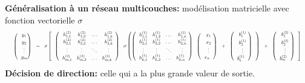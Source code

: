 \documentclass[10pt]{beamer}
\begin{document}
\begin{frame}
\begin{columns}[T]
\begin{column}{0.60\textwidth}
  \vspace{-0.4cm}
  \textbf{Généralisation à un réseau multicouches:} modélisation matricielle avec fonction vectorielle $\sigma$
  \begin{equation*}
  \resizebox{\textwidth}{!}{
  $\begin{pmatrix}
    y_{1} \\[0.3em]
    y_{2} \\
    \vdots \\
    y_{m}
  \end{pmatrix}
    =
    \sigma\left[
    \begin{pmatrix}
    h^{(2)}_{1,1} & h^{(2)}_{1,2} & \ldots & h^{(2)}_{1,k} \\
    h^{(2)}_{2,1} & h^{(2)}_{2,2} & \ldots & h^{(2)}_{2,k} \\
    \vdots & \vdots & \ddots & \vdots \\
    h^{(2)}_{m,1} & h^{(2)}_{m,2} & \ldots & h^{(2)}_{m,k}
    \end{pmatrix}
    \sigma\left(
  \begin{pmatrix}
    h^{(1)}_{1,1} & h^{(1)}_{1,2} & \ldots & h^{(1)}_{1,n} \\
    h^{(1)}_{2,1} & h^{(1)}_{2,2} & \ldots & h^{(1)}_{2,n} \\
    \vdots & \vdots & \ddots & \vdots \\
    h^{(1)}_{k,1} & h^{(1)}_{k,2} & \ldots & h^{(1)}_{k,n}
    \end{pmatrix}
    \begin{pmatrix}
    x_{1} \\[0.3em]
    x_{2} \\
    \vdots \\
    x_{n}
    \end{pmatrix}
    +
    \begin{pmatrix}
    b_{1}^{(1)} \\[0.3em]
    b_{2}^{(1)} \\
    \vdots \\
    b_{k}^{(1)}
    \end{pmatrix}
    \right)
    +
    \begin{pmatrix}
    b_{1}^{(2)} \\[0.3em]
    b_{2}^{(2)} \\
    \vdots \\
    b_{m}^{(2)}
    \end{pmatrix}
    \right] 
  $}
  \end{equation*}
  \textbf{Décision de direction:} celle qui a la plus grande valeur de sortie.


\end{column}
\end{columns}
\end{frame}
\end{document}
